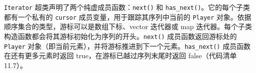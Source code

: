 \texttt{Iterator} 超类声明了两个纯虚成员函数：\texttt{next()} 和 \texttt{has\_\allowbreak{}next(\allowbreak{})\allowbreak{}}。它的每个子类都有一个私有的 \texttt{cursor} 成员变量，用于跟踪其序列中当前的 \texttt{Player} 对象。依据顺序集合的类型，游标可以是数组下标、vector 迭代器或 map 迭代器。每个子类构造函数都会将其游标初始化为序列的开头。\texttt{next()} 成员函数返回游标处的 \texttt{Player} 对象（即当前元素），并将游标推进到下一个元素。\texttt{has\_\allowbreak{}next(\allowbreak{})\allowbreak{}} 成员函数在还有更多元素时返回 true，在游标已越过序列末尾时返回 false（代码清单 11.7）。


